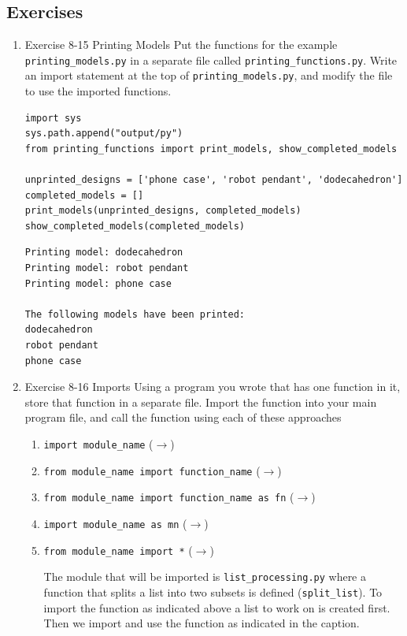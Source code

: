 \documentclass[10pt]{book}
\begin{document}
\subsection{Exercises}
\label{sec:org56c7ff8}
\begin{enumerate}
\item Exercise 8-15 Printing Models
\label{sec:org6c2e657}
Put the functions for the example \texttt{printing\_models.py} in a separate file called \texttt{printing\_functions.py}. Write an import statement at the top of \texttt{printing\_models.py}, and modify the file to use the imported functions.

\label{org0c6457f}
\begin{verbatim}
import sys
sys.path.append("output/py")  
from printing_functions import print_models, show_completed_models

unprinted_designs = ['phone case', 'robot pendant', 'dodecahedron']
completed_models = []
print_models(unprinted_designs, completed_models)
show_completed_models(completed_models)
\end{verbatim}

\label{org782b081}
\begin{verbatim}
Printing model: dodecahedron
Printing model: robot pendant
Printing model: phone case

The following models have been printed:
dodecahedron
robot pendant
phone case
\end{verbatim}
\item Exercise 8-16 Imports
\label{sec:orgc33b750}
Using a program you wrote that has one function in it, store that function in a separate file. Import the function into your main program file, and call the function using each of these approaches
\begin{enumerate}
\item \texttt{import module\_name} (\hyperref[org599034a]{\(\rightarrow\)})
\item \texttt{from module\_name import function\_name} (\hyperref[org381b5e2]{\(\rightarrow\)})
\item \texttt{from module\_name import function\_name as fn} (\hyperref[org47e89c3]{\(\rightarrow\)})
\item \texttt{import module\_name as mn} (\hyperref[org4ec41be]{\(\rightarrow\)})
\item \texttt{from module\_name import *} (\hyperref[org2017463]{\(\rightarrow\)})

The module that will be imported is \texttt{list\_processing.py} where a function that splits a list into two subsets is defined (\texttt{split\_list}). To import the function as indicated above a list to work on is created first. Then we import and use the function as indicated in the caption.
\end{enumerate}


\end{enumerate}
\end{document}
